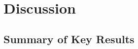 \documentclass[12pt]{article}
\begin{document}

\section{Discussion}\label{sec:discussion}

\subsection{Summary of Key Results}
\end{document}
